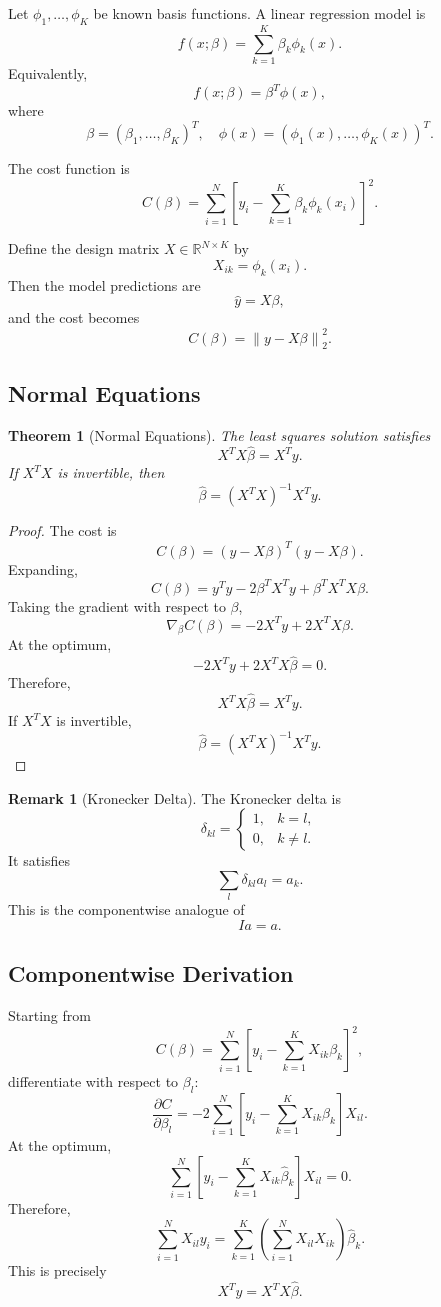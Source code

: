 \documentclass[12pt,oneside]{book}
\numberwithin{equation}{section}
\theoremstyle{definition}
\newtheorem{remark}{Remark}[section]
\theoremstyle{plain}
\newtheorem{theorem}{Theorem}[section]
\theoremstyle{remark}
\newcommand{\R}{\mathbb{R}}
\newcommand{\norm}[1]{\left\lVert #1 \right\rVert}
\newcommand{\grad}{\nabla}
\begin{document}
Let $\phi_1,\dots,\phi_K$ be known basis functions. A linear regression model is
\[
f(x;\beta)
=
\sum_{k=1}^K \beta_k \phi_k(x).
\]
Equivalently,
\[
f(x;\beta)=\beta^T\phi(x),
\]
where
\[
\beta=(\beta_1,\dots,\beta_K)^T,
\quad
\phi(x)=(\phi_1(x),\dots,\phi_K(x))^T.
\]

The cost function is
\[
C(\beta)
=
\sum_{i=1}^N
\left[
y_i-\sum_{k=1}^K \beta_k\phi_k(x_i)
\right]^2.
\]

Define the design matrix $X \in \R^{N\times K}$ by
\[
X_{ik}=\phi_k(x_i).
\]
Then the model predictions are
\[
\hat{y}=X\beta,
\]
and the cost becomes
\[
C(\beta)
=
\norm{y-X\beta}_2^2.
\]

\subsection{Normal Equations}

\begin{theorem}[Normal Equations]
The least squares solution satisfies
\[
X^T X\hat{\beta}=X^T y.
\]
If $X^T X$ is invertible, then
\[
\hat{\beta}
=
(X^T X)^{-1}X^T y.
\]
\end{theorem}

\begin{proof}
The cost is
\[
C(\beta)
=
(y-X\beta)^T(y-X\beta).
\]
Expanding,
\[
C(\beta)
=
y^Ty - 2\beta^T X^T y + \beta^T X^T X\beta.
\]
Taking the gradient with respect to $\beta$,
\[
\grad_\beta C(\beta)
=
-2X^Ty + 2X^T X\beta.
\]
At the optimum,
\[
-2X^Ty + 2X^T X\hat{\beta}=0.
\]
Therefore,
\[
X^T X\hat{\beta}=X^T y.
\]
If $X^T X$ is invertible,
\[
\hat{\beta}
=
(X^T X)^{-1}X^T y.
\]
\end{proof}

\begin{remark}[Kronecker Delta]
The Kronecker delta is
\[
\delta_{kl}
=
\begin{cases}
1, & k=l,\\
0, & k\neq l.
\end{cases}
\]
It satisfies
\[
\sum_l \delta_{kl}a_l=a_k.
\]
This is the componentwise analogue of
\[
Ia=a.
\]
\end{remark}

\subsection{Componentwise Derivation}

Starting from
\[
C(\beta)
=
\sum_{i=1}^N
\left[
y_i-\sum_{k=1}^K X_{ik}\beta_k
\right]^2,
\]
differentiate with respect to $\beta_l$:
\[
\frac{\partial C}{\partial \beta_l}
=
-2\sum_{i=1}^N
\left[
y_i-\sum_{k=1}^K X_{ik}\beta_k
\right]X_{il}.
\]
At the optimum,
\[
\sum_{i=1}^N
\left[
y_i-\sum_{k=1}^K X_{ik}\hat{\beta}_k
\right]X_{il}
=
0.
\]
Therefore,
\[
\sum_{i=1}^N X_{il}y_i
=
\sum_{k=1}^K
\left(
\sum_{i=1}^N X_{il}X_{ik}
\right)\hat{\beta}_k.
\]
This is precisely
\[
X^Ty=X^TX\hat{\beta}.
\]
\end{document}
